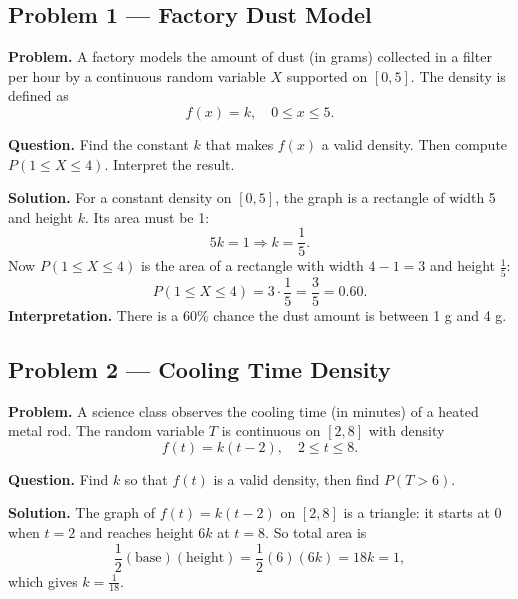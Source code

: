 	
	\begin{ExamProblems}
		
		\hypertarget{c1-ex1}{}
		\item
		\subsection*{Problem 1 — Factory Dust Model}
		
		\textbf{Problem.}
		A factory models the amount of dust (in grams) collected in a filter per hour by a continuous random variable
		\(X\) supported on \([0,5]\). The density is defined as
		\[
		f(x)=k,\quad 0\le x\le 5.
		\]
		
		\textbf{Question.} Find the constant \(k\) that makes \(f(x)\) a valid density. Then compute
		\(P(1\le X\le 4)\). Interpret the result.
		
		\textbf{Solution.}
		For a constant density on \([0,5]\), the graph is a rectangle of width 5 and height \(k\).
		Its area must be 1:
		\[
		5k=1\Rightarrow k=\frac{1}{5}.
		\]
		Now \(P(1\le X\le 4)\) is the area of a rectangle with width \(4-1=3\) and height \(\frac{1}{5}\):
		\[
		P(1\le X\le 4)=3\cdot\frac{1}{5}=\frac{3}{5}=0.60.
		\]
		\textbf{Interpretation.} There is a 60\% chance the dust amount is between 1 g and 4 g.
		
		
		\hypertarget{c1-ex2}{}
		\item
		\subsection*{Problem 2 — Cooling Time Density}
		
		\textbf{Problem.}
		A science class observes the cooling time (in minutes) of a heated metal rod. The random variable
		\(T\) is continuous on \([2, 8]\) with density
		\[
		f(t)=k(t-2),\quad 2\le t\le 8.
		\]
		
		\textbf{Question.} Find \(k\) so that \(f(t)\) is a valid density, then find \(P(T>6)\).
		
		\textbf{Solution.}
		The graph of \(f(t)=k(t-2)\) on \([2,8]\) is a triangle:
		it starts at 0 when \(t=2\) and reaches height \(6k\) at \(t=8\).
		So total area is
		\[
		\frac{1}{2}(\text{base})(\text{height})=\frac{1}{2}(6)(6k)=18k=1,
		\]
		which gives \(k=\frac{1}{18}\).
		

\end{ExamProblems}
